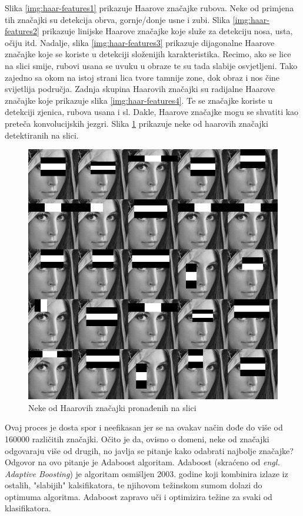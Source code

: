 Slika \ref{img:haar-features1} prikazuje Haarove značajke rubova. Neke od primjena tih značajki su detekcija obrva, gornje/donje usne i zubi. Slika \ref{img:haar-features2} prikazuje linijske Haarove značajke koje služe za detekciju nosa, usta, očiju itd. Nadalje, slika \ref{img:haar-features3} prikazuje dijagonalne Haarove značajke koje se koriste u detekciji složenijih karakteristika. Recimo, ako se lice na slici smije, rubovi usana se uvuku u obraze te su tada slabije osvjetljeni. Tako zajedno sa okom na istoj strani lica tvore tamnije zone, dok obraz i nos čine svijetlija područja. Zadnja skupina Haarovih značajki su radijalne Haarove značajke koje prikazuje slika \ref{img:haar-features4}. Te se značajke koriste u detekciji zjenica, rubova usana i sl. Dakle, Haarove značajke mogu se shvatiti kao preteča konvolucijskih jezgri. Slika \ref{img:haar-image} prikazuje neke od haarovih značajki detektiranih na slici.

\begin{figure}[htb]
	\centering
	\includegraphics[width=12cm]{img/Haar3.jpg}
	\caption{Neke od Haarovih značajki pronađenih na slici}
	\label{img:haar-image}
\end{figure}

Ovaj proces je dosta spor i neefikasan jer se na ovakav način dođe do više od 160000 različitih značajki. Očito je da, ovisno o domeni, neke od značajki odgovaraju više od drugih, no javlja se pitanje kako odabrati najbolje značajke? Odgovor na ovo pitanje je Adaboost algoritam. Adaboost (skraćeno od \textit{engl. Adaptive Boosting}) je algoritam osmišljen 2003. godine koji kombinira izlaze iz ostalih, "slabijih" kalsifikatora, te njihovom težinskom sumom dolazi do optimuma algoritma. Adaboost zapravo uči i optimizira težine za svaki od klasifikatora.


